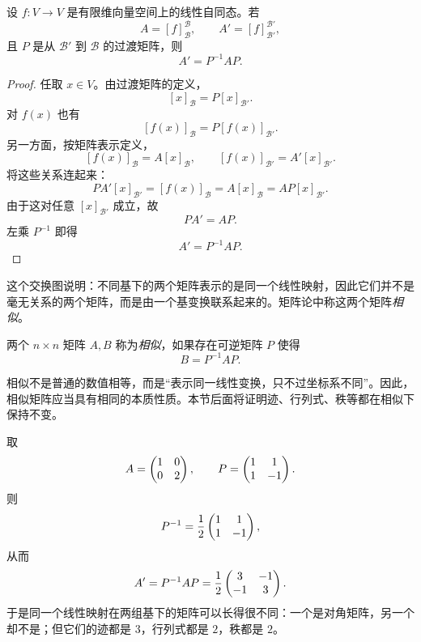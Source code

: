 \begin{theorem}[基变换公式]
设 $f\colon V\to V$ 是有限维向量空间上的线性自同态。若
\[
  A=[f]_{\mathcal B}^{\mathcal B},
  \qquad
  A'=[f]_{\mathcal B'}^{\mathcal B'},
\]
且 $P$ 是从 $\mathcal B'$ 到 $\mathcal B$ 的过渡矩阵，则
\[
  A'=P^{-1}AP.
\]
\end{theorem}

\begin{proof}
任取 $x\in V$。由过渡矩阵的定义，
\[
  [x]_{\mathcal B}=P[x]_{\mathcal B'}.
\]
对 $f(x)$ 也有
\[
  [f(x)]_{\mathcal B}=P[f(x)]_{\mathcal B'}.
\]
另一方面，按矩阵表示定义，
\[
  [f(x)]_{\mathcal B}=A[x]_{\mathcal B},
  \qquad
  [f(x)]_{\mathcal B'}=A'[x]_{\mathcal B'}.
\]
将这些关系连起来：
\[
  P A'[x]_{\mathcal B'}=[f(x)]_{\mathcal B}=A[x]_{\mathcal B}=AP[x]_{\mathcal B'}.
\]
由于这对任意 $[x]_{\mathcal B'}$ 成立，故
\[
  PA'=AP.
\]
左乘 $P^{-1}$ 即得
\[
  A'=P^{-1}AP.
\]
\end{proof}

\begin{center}
\end{center}

这个交换图说明：不同基下的两个矩阵表示的是同一个线性映射，因此它们并不是毫无关系的两个矩阵，而是由一个基变换联系起来的。矩阵论中称这两个矩阵\emph{相似}。

\begin{definition}
两个 $n\times n$ 矩阵 $A,B$ 称为\emph{相似}，如果存在可逆矩阵 $P$ 使得
\[
  B=P^{-1}AP.
\]
\end{definition}

\begin{remark}
相似不是普通的数值相等，而是“表示同一线性变换，只不过坐标系不同”。因此，相似矩阵应当具有相同的本质性质。本节后面将证明迹、行列式、秩等都在相似下保持不变。
\end{remark}

\begin{example}
取
\[
  A=\begin{pmatrix} 1 & 0\\ 0 & 2 \end{pmatrix},
  \qquad
  P=\begin{pmatrix} 1 & 1\\ 1 & -1 \end{pmatrix}.
\]
则
\[
  P^{-1}=\frac12\begin{pmatrix} 1 & 1\\ 1 & -1 \end{pmatrix},
\]
从而
\[
  A'=P^{-1}AP=\frac12\begin{pmatrix} 3 & -1\\ -1 & 3 \end{pmatrix}.
\]
于是同一个线性映射在两组基下的矩阵可以长得很不同：一个是对角矩阵，另一个却不是；但它们的迹都是 $3$，行列式都是 $2$，秩都是 $2$。
\end{example}


